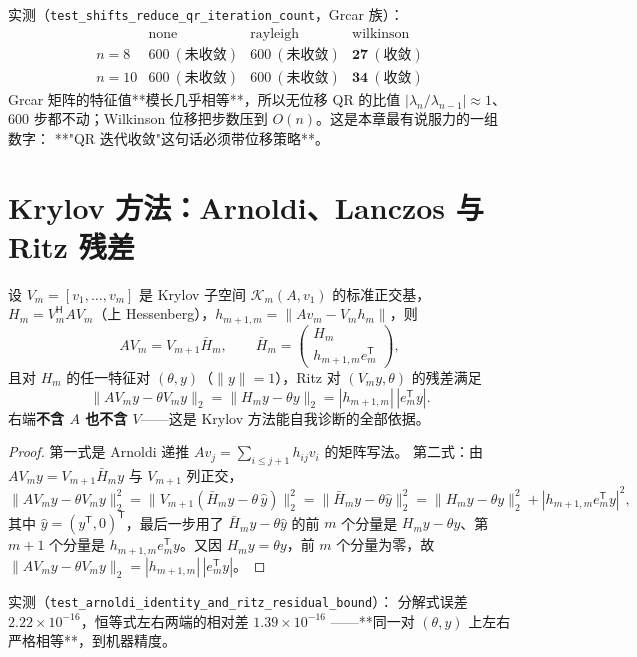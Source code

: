 实测（\texttt{test\_shifts\_reduce\_qr\_iteration\_count}，Grcar 族）：
\[
\begin{array}{c|ccc}
 & \text{none} & \text{rayleigh} & \text{wilkinson}\\\hline
n=8  & 600\ (\text{未收敛}) & 600\ (\text{未收敛}) & \mathbf{27}\ (\text{收敛})\\
n=10 & 600\ (\text{未收敛}) & 600\ (\text{未收敛}) & \mathbf{34}\ (\text{收敛})
\end{array}
\]
Grcar 矩阵的特征值**模长几乎相等**，所以无位移 QR 的比值 $|\lambda_n/\lambda_{n-1}|\approx1$、
600 步都不动；Wilkinson 位移把步数压到 $O(n)$。这是本章最有说服力的一组数字：
**"QR 迭代收敛"这句话必须带位移策略**。

\section{Krylov 方法：Arnoldi、Lanczos 与 Ritz 残差}

\begin{theorem}
\label{thm:arnoldi}
设 $V_m=[v_1,\dots,v_m]$ 是 Krylov 子空间 $\mathcal{K}_m(A,v_1)$ 的标准正交基，
$H_m=V_m^{\mathsf H}AV_m$（上 Hessenberg），$h_{m+1,m}=\|Av_m-V_mh_m\|$，则
\[
  AV_m=V_{m+1}\bar H_m,\qquad
  \bar H_m=\begin{pmatrix}H_m\\ h_{m+1,m}e_m^{\mathsf T}\end{pmatrix},
\]
且对 $H_m$ 的任一特征对 $(\theta,y)$（$\|y\|=1$），Ritz 对 $(V_my,\theta)$ 的残差满足
\[
  \|AV_my-\theta V_my\|_2=\|H_my-\theta y\|_2=|h_{m+1,m}|\,|e_m^{\mathsf T}y| .
\]
右端\textbf{不含 $A$ 也不含 $V$}——这是 Krylov 方法能自我诊断的全部依据。
\end{theorem}

\begin{proof}
第一式是 Arnoldi 递推 $Av_j=\sum_{i\le j+1}h_{ij}v_i$ 的矩阵写法。
第二式：由 $AV_my=V_{m+1}\bar H_my$ 与 $V_{m+1}$ 列正交，
\[
  \|AV_my-\theta V_my\|_2^2
  =\|V_{m+1}(\bar H_my-\theta\,\hat y)\|_2^2
  =\|\bar H_my-\theta\hat y\|_2^2
  =\|H_my-\theta y\|_2^2+|h_{m+1,m}e_m^{\mathsf T}y|^2 ,
\]
其中 $\hat y=(y^{\mathsf T},0)^{\mathsf T}$，最后一步用了
$\bar H_my-\theta\hat y$ 的前 $m$ 个分量是 $H_my-\theta y$、第 $m+1$ 个分量是
$h_{m+1,m}e_m^{\mathsf T}y$。又因 $H_my=\theta y$，前 $m$ 个分量为零，故
$\|AV_my-\theta V_my\|_2=|h_{m+1,m}|\,|e_m^{\mathsf T}y|$。
\end{proof}

实测（\texttt{test\_arnoldi\_identity\_and\_ritz\_residual\_bound}）：
分解式误差 $2.22\times10^{-16}$，恒等式左右两端的相对差 $1.39\times10^{-16}$
——**同一对 $(\theta,y)$ 上左右严格相等**，到机器精度。

